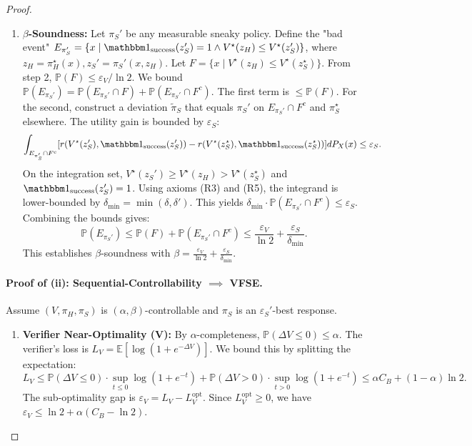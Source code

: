 \begin{proof}
\begin{enumerate}
\item  \textbf{$\beta$-Soundness:} Let $\pi_S'$ be any measurable sneaky policy. Define the "bad event" $E_{\pi_S'} = \{x \mid \success(z_S')=1 \land V^\star(z_H) \le V^\star(z_S') \}$, where $z_H=\pi_H^\star(x), z_S'=\pi_S'(x,z_H)$. Let $F = \{x \mid V^\star(z_H) \le V^\star(z_S^\star)\}$. From step 2, $\mathbb{P}(F) \le \varepsilon_V/\ln 2$. We bound $\mathbb{P}(E_{\pi_S'}) = \mathbb{P}(E_{\pi_S'} \cap F) + \mathbb{P}(E_{\pi_S'} \cap F^c)$. The first term is $\le \mathbb{P}(F)$. For the second, construct a deviation $\tilde{\pi}_S$ that equals $\pi_S'$ on $E_{\pi_S'} \cap F^c$ and $\pi_S^\star$ elsewhere. The utility gain is bounded by $\varepsilon_S$:
    \[ \int_{E_{\pi_S'} \cap F^c} [r(V^\star(z_S'), \success(z_S')) - r(V^\star(z_S^\star), \success(z_S^\star))] dP_X(x) \le \varepsilon_S. \]
    On the integration set, $V^\star(z_S') \ge V^\star(z_H) > V^\star(z_S^\star)$ and $\success(z_S')=1$. Using axioms (R3) and (R5), the integrand is lower-bounded by $\delta_{\min} = \min(\delta, \delta')$. This yields $\delta_{\min} \cdot \mathbb{P}(E_{\pi_S'} \cap F^c) \le \varepsilon_S$. Combining the bounds gives:
    \[ \mathbb{P}(E_{\pi_S'}) \le \mathbb{P}(F) + \mathbb{P}(E_{\pi_S'} \cap F^c) \le \frac{\varepsilon_V}{\ln 2} + \frac{\varepsilon_S}{\delta_{\min}}. \]
    This establishes $\beta$-soundness with $\beta = \frac{\varepsilon_V}{\ln 2} + \frac{\varepsilon_S}{\delta_{\min}}$.
\end{enumerate}

\paragraph{Proof of (ii): Sequential-Controllability $\implies$ VFSE.}
Assume $(V, \pi_H, \pi_S)$ is $(\alpha, \beta)$-controllable and $\pi_S$ is an $\varepsilon_S'$-best response.
\begin{enumerate}
\item  \textbf{Verifier Near-Optimality (V):} By $\alpha$-completeness, $\mathbb{P}(\Delta V \le 0) \le \alpha$. The verifier's loss is $L_V = \mathbb{E}[\log(1+e^{-\Delta V})]$. We bound this by splitting the expectation:
    \[ L_V \le \mathbb{P}(\Delta V \le 0) \cdot \sup_{t \le 0}\log(1+e^{-t}) + \mathbb{P}(\Delta V > 0) \cdot \sup_{t > 0}\log(1+e^{-t}) \le \alpha C_B + (1-\alpha)\ln 2. \]
    The sub-optimality gap is $\varepsilon_V = L_V - L_V^\mathrm{opt}$. Since $L_V^\mathrm{opt} \ge 0$, we have $\varepsilon_V \le \ln 2 + \alpha(C_B - \ln 2)$.


\end{enumerate}
\end{proof}
